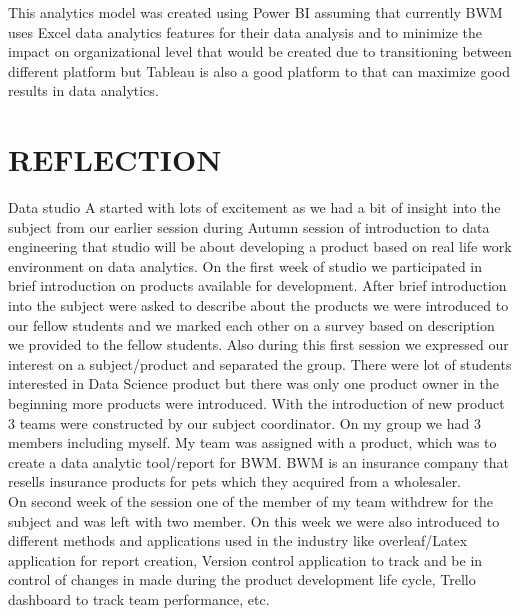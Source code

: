 \documentclass{article}
\begin{document}
This analytics model was created using Power BI assuming that currently BWM uses Excel data analytics features for their data analysis and to minimize the impact on organizational level that would be created due to transitioning between different platform but Tableau is also a good platform to that can maximize good results in data analytics.\pagebreak

\section{REFLECTION}\label{sec:Reflection}


Data studio A started with lots of excitement as we had a bit of insight into the subject from our earlier session during Autumn session of introduction to data engineering that studio will be about developing a product based on real life work environment on data analytics. On the first week of studio we participated in brief introduction on products available for development. After brief introduction into the subject were asked to describe about the products we were introduced to our fellow students and we marked each other on a survey based on description we provided to the fellow students. Also during this first session we expressed our interest on a subject/product and separated the group. There were lot of students interested in Data Science product but there was only one product owner in the beginning more products were introduced. With the introduction of new product 3 teams were constructed by our subject coordinator. On my group we had 3 members including myself. My team was assigned with a product, which was to create a data analytic tool/report for BWM. BWM is an insurance company that resells insurance products for pets which they acquired from a wholesaler.\\ 

On second week of the session one of the member of my team withdrew for the subject and was left with two member. On this week we were also introduced to different methods and applications used in the industry like overleaf/Latex application for report creation, Version control application to track and be in control of changes in made during the product development life cycle, Trello dashboard to track team performance, etc.\\
\end{document}
